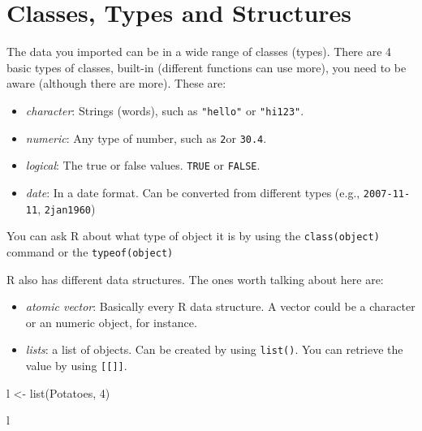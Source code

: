 \documentclass[
]{book}
\newenvironment{Shaded}{\begin{snugshade}}{\end{snugshade}}
\newcommand{\DecValTok}[1]{\textcolor[rgb]{0.00,0.00,0.81}{#1}}
\newcommand{\FunctionTok}[1]{\textcolor[rgb]{0.00,0.00,0.00}{#1}}
\newcommand{\NormalTok}[1]{#1}
\newcommand{\OtherTok}[1]{\textcolor[rgb]{0.56,0.35,0.01}{#1}}
\newcommand{\StringTok}[1]{\textcolor[rgb]{0.31,0.60,0.02}{#1}}
\begin{document}
\hypertarget{classes-types-and-structures}{%
\section{Classes, Types and Structures}\label{classes-types-and-structures}}

The data you imported can be in a wide range of classes (types).
There are 4 basic types of classes, built-in (different functions can use more), you need to be aware (although there are more).
These are:

\begin{itemize}
\item
  \emph{character}: Strings (words), such as \texttt{"hello"} or \texttt{"hi123"}.\\
\item
  \emph{numeric}: Any type of number, such as \texttt{2}or \texttt{30.4}.\\
\item
  \emph{logical}: The true or false values.
  \texttt{TRUE} or \texttt{FALSE}.
\item
  \emph{date}: In a date format.
  Can be converted from different types (e.g., \texttt{2007-11-11}, \texttt{2jan1960})
\end{itemize}

You can ask R about what type of object it is by using the \texttt{class(object)} command or the \texttt{typeof(object)}

R also has different data structures.
The ones worth talking about here are:

\begin{itemize}
\item
  \emph{atomic vector}: Basically every R data structure.
  A vector could be a character or an numeric object, for instance.
\item
  \emph{lists}: a list of objects.
  Can be created by using \texttt{list()}.
  You can retrieve the value by using \texttt{{[}{[}{]}{]}}.
\end{itemize}

\begin{Shaded}
\begin{Highlighting}[]
\NormalTok{l }\OtherTok{\textless{}{-}} \FunctionTok{list}\NormalTok{(}\StringTok{\textquotesingle{}Potatoes\textquotesingle{}}\NormalTok{, }\DecValTok{4}\NormalTok{)}

\NormalTok{l}
\end{Highlighting}
\end{Shaded}
\end{document}
